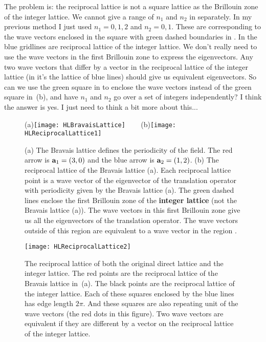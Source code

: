 \begin{description}
{The problem is: the reciprocal lattice is not a square lattice as the
Brillouin zone of the integer lattice. We cannot give a range of $n_1$
and $n_2$ in  separately. In my previous method I
just used $n_1=0,1,2$ and $n_2 = 0,1$. These are corresponding to the
wave vectors enclosed in the square with green dashed boundaries in
. In 
the blue gridlines are reciprocal lattice of the integer lattice. We
don't really need to use the wave vectors in the first Brillouin zone to
express the eigenvectors. Any two wave vectors that differ by a vector in
the reciprocal lattice of the integer lattice (in
 it's the lattice of blue lines) should
give us equivalent eigenvectors. So can we use the green square in
 to enclose the wave vectors instead of
the green square in \,(b), and have $n_1$
and $n_2$ go over a set of integers independently? I think the answer is
yes. I just need to think a bit more about this...
}

\begin{figure}
  \centering
(a)\texttt{[image: HLBravaisLattice]}
~~~
(b)\texttt{[image: HLReciprocalLattice1]}
  \caption{\label{fig:HLReciprocalLattice}
(a)
    The Bravais lattice defines the periodicity of the field. The red arrow is
    ${\bf a}_1=(3,0)$ and the blue arrow is ${\bf a}_2=(1,2)$.
(b)
    The reciprocal lattice of the Bravais lattice (a). Each reciprocal
    lattice point is a wave vector of the eigenvector of the translation
    operator with periodicity given by the Bravais lattice (a). The green
    dashed lines enclose the first Brillouin zone of the {\bf integer
    lattice} (not the Bravais lattice (a)). The wave vectors in this
    first Brillouin zone give us all the eigenvectors of the translation
    operator. The wave vectors outside of this region  are equivalent to
    a wave vector in the region .
}
\end{figure}

\begin{figure}
  \centering
\texttt{[image: HLReciprocalLattice2]}
  \caption{\label{fig:HLReciprocalLattice2}
The reciprocal lattice of both the original direct lattice and the
integer lattice. The red points are the reciprocal lattice of the Bravais
lattice in \,(a). The black points are
the reciprocal lattice of the integer lattice. Each of these squares
enclosed by the blue lines has edge length $2 \pi$. And these squares are
also repeating unit of the wave vectors (the red dots in this figure).
Two wave vectors are equivalent if they are different by a vector on the
reciprocal lattice of the integer lattice.
}
\end{figure}


\end{description}
